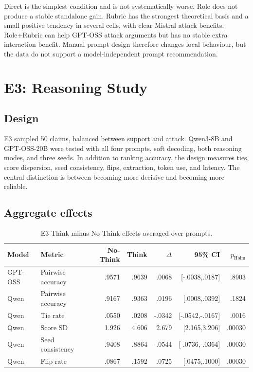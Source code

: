 \documentclass[11pt,twoside,a4paper]{report}
\newcommand{\holmp}{\ensuremath{p_{\mathrm{Holm}}}}
\begin{document}
Direct is the simplest condition and is not systematically worse.  Role does not
produce a stable standalone gain.  Rubric has the strongest theoretical basis and a
small positive tendency in several cells, with clear Mistral attack benefits.
Role+Rubric can help GPT-OSS attack arguments but has no stable extra interaction
benefit.  Manual prompt design therefore changes local behaviour, but the data do not
support a model-independent prompt recommendation.

\section{E3: Reasoning Study}
\label{sec:e3}

\subsection{Design}

E3 sampled 50 claims, balanced between support and attack.  Qwen3-8B and
GPT-OSS-20B were tested with all four prompts, soft decoding, both reasoning modes,
and three seeds.  In addition to ranking accuracy, the design measures ties,
score dispersion, seed consistency, flips, extraction, token use, and latency.  The
central distinction is between becoming more decisive and becoming more reliable.

\subsection{Aggregate effects}

\begin{table}[htbp]
\centering
\caption{E3 Think minus No-Think effects averaged over prompts.}
\label{tab:e3-effects}
\begin{tabularx}{\textwidth}{llrrrrr}
\toprule
Model & Metric & No-Think & Think & $\Delta$ & 95\% CI & \holmp{} \\
\midrule
GPT-OSS & Pairwise accuracy & .9571 & .9639 & .0068 & [-.0038,.0187] & .8903 \\
Qwen & Pairwise accuracy & .9167 & .9363 & .0196 & [.0008,.0392] & .1824 \\
Qwen & Tie rate & .0550 & .0208 & -.0342 & [-.0542,-.0167] & .0016 \\
Qwen & Score SD & 1.926 & 4.606 & 2.679 & [2.165,3.206] & .00030 \\
Qwen & Seed consistency & .9408 & .8864 & -.0544 & [-.0736,-.0364] & .00030 \\
Qwen & Flip rate & .0867 & .1592 & .0725 & [.0475,.1000] & .00030 \\
\bottomrule
\end{tabularx}
\end{table}
\end{document}
